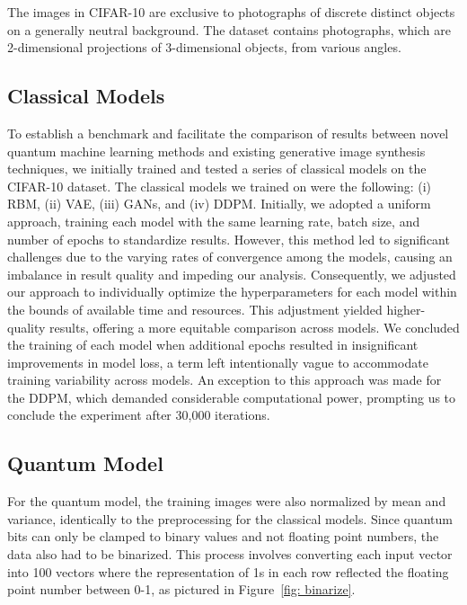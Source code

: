 \documentclass[%
 reprint,
 amsmath,amssymb,
 aps,
]{revtex4-2}
\begin{document}
The images in CIFAR-10 are exclusive to photographs of discrete distinct objects on a generally neutral background. The dataset contains photographs, which are 2-dimensional projections of 3-dimensional objects, from various angles.

\subsection{Classical Models}

To establish a benchmark and facilitate the comparison of results between novel quantum machine learning methods and existing generative image synthesis techniques, we initially trained and tested a series of classical models on the CIFAR-10 dataset. The classical models we trained on were the following: (i) RBM, (ii) VAE, (iii) GANs, and (iv) DDPM. Initially, we adopted a uniform approach, training each model with the same learning rate, batch size, and number of epochs to standardize results. However, this method led to significant challenges due to the varying rates of convergence among the models, causing an imbalance in result quality and impeding our analysis. Consequently, we adjusted our approach to individually optimize the hyperparameters for each model within the bounds of available time and resources. This adjustment yielded higher-quality results, offering a more equitable comparison across models. We concluded the training of each model when additional epochs resulted in insignificant improvements in model loss, a term left intentionally vague to accommodate training variability across models. An exception to this approach was made for the DDPM, which demanded considerable computational power, prompting us to conclude the experiment after 30,000 iterations.


\subsection{Quantum Model}
\label{binarize}
For the quantum model, the training images were also normalized by mean and variance, identically to the preprocessing for the classical models. Since quantum bits can only be clamped to binary values and not floating point numbers, the data also had to be binarized. This process involves converting each input vector into 100 vectors where the representation of 1s in each row reflected the floating point number between 0-1, as pictured in Figure~\ref{fig: binarize}.
\end{document}
